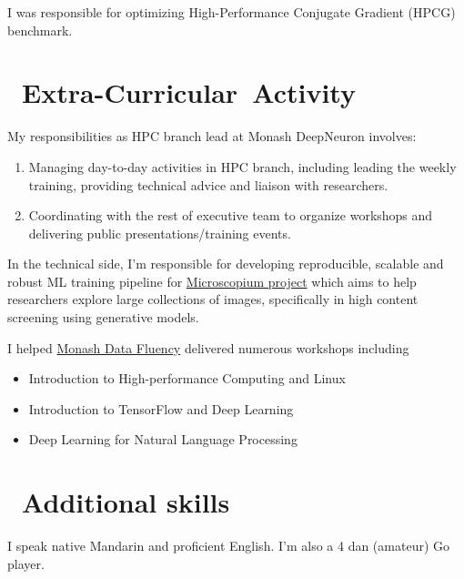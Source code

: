 \documentclass{resume}
\begin{document}
I was responsible for optimizing High-Performance Conjugate Gradient (HPCG) benchmark.


\section{\faGroup\ Extra-Curricular\ Activity}



My responsibilities as HPC branch lead at Monash DeepNeuron involves:
\begin{enumerate}
  \item Managing day-to-day activities in HPC branch, including leading the weekly training, providing technical advice and liaison with researchers.
  \item Coordinating with the rest of executive team to organize workshops and delivering public presentations/training events.
\end{enumerate}

In the technical side, I'm responsible for developing reproducible, scalable and robust ML training pipeline for
\href{https://www.deepneuron.org/projects}{Microscopium project} which aims to help researchers explore large collections of images,
specifically in high content screening using generative models.



I helped \href{https://www.monash.edu/data-fluency}{Monash Data Fluency}
delivered numerous workshops including
\begin{itemize}
  \item Introduction to High-performance Computing and Linux
  \item Introduction to TensorFlow and Deep Learning
  \item Deep Learning for Natural Language Processing
\end{itemize}


\section{\faLanguage\ Additional skills}

I speak native Mandarin and proficient English. I'm also a 4 dan (amateur) Go player.
\end{document}
